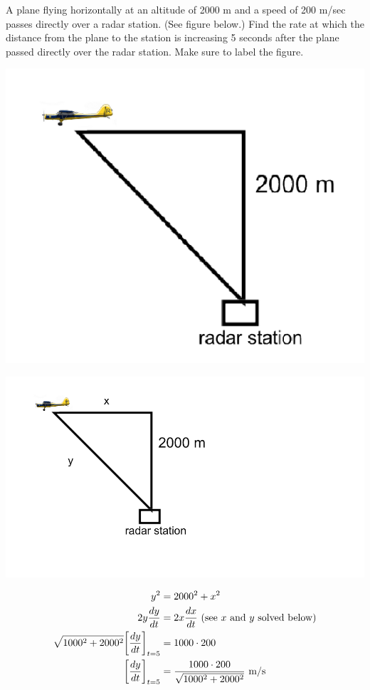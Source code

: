 \documentclass[nooutcomes]{ximera}
\begin{document}
\begin{problem}
A plane flying horizontally at an altitude of 2000 m and a speed of 200 m/sec passes directly over a radar station.  (See figure below.)  Find the rate at which the distance from the plane to the station is increasing 5 seconds after the plane passed directly over the radar station.  Make sure to label the figure.

	\begin{image}
	\includegraphics[scale=.5]{Figure4.png}
	\end{image}
\begin{freeResponse} \hfil

	\begin{image}
	\includegraphics[scale=.5]{Figure5.png}
	\end{image}

	\begin{align*}
	y^2&=2000^2+x^2\\
	2y{\frac{dy}{dt}}&=2x{\frac{dx}{dt}}\ \text{(see $x$ and $y$ solved below)}\\
	\sqrt{1000^2+2000^2}\bigg[ {\frac{dy}{dt}} \bigg]_{t=5}&=1000 \cdot 200 \\
	\bigg[ {\frac{dy}{dt}} \bigg]_{t=5}&=\frac{1000 \cdot 200}{\sqrt{1000^2+2000^2}}\ \text{m/s}
	\end{align*}


\end{freeResponse}
\end{problem}
\end{document}
